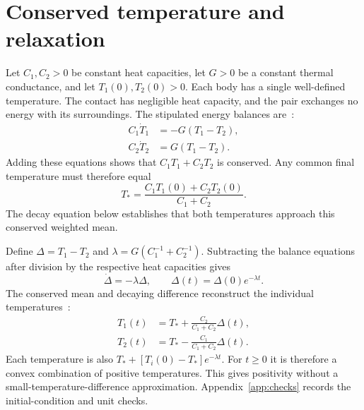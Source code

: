 \section{Conserved temperature and relaxation}
Let $C_1,C_2>0$ be constant heat capacities, let $G>0$ be a constant thermal conductance, and let $T_1(0),T_2(0)>0$. Each body has a single well-defined temperature. The contact has negligible heat capacity, and the pair exchanges no energy with its surroundings. The stipulated energy balances are~\cite{fixturemodel}:
\begin{align}
 C_1\dot T_1&=-G(T_1-T_2),\label{eq:balance1}\\
 C_2\dot T_2&= G(T_1-T_2).\label{eq:balance2}
\end{align}
Adding these equations shows that $C_1T_1+C_2T_2$ is conserved. Any common final temperature must therefore equal
\begin{equation}
 T_* = \frac{C_1T_1(0)+C_2T_2(0)}{C_1+C_2}.\label{eq:tstar}
\end{equation}
The decay equation below establishes that both temperatures approach this conserved weighted mean.

Define $\Delta=T_1-T_2$ and $\lambda=G(C_1^{-1}+C_2^{-1})$. Subtracting the balance equations after division by the respective heat capacities gives
\begin{equation}
 \dot\Delta=-\lambda\Delta,\qquad
 \Delta(t)=\Delta(0)e^{-\lambda t}.\label{eq:delta}
\end{equation}
The conserved mean and decaying difference reconstruct the individual temperatures~\cite{fixturealgebra}:
\begin{align}
 T_1(t)&=T_*+\frac{C_2}{C_1+C_2}\Delta(t),\label{eq:t1}\\
 T_2(t)&=T_*-\frac{C_1}{C_1+C_2}\Delta(t).\label{eq:t2}
\end{align}
Each temperature is also $T_*+[T_i(0)-T_*]e^{-\lambda t}$. For $t\geq0$ it is therefore a convex combination of positive temperatures. This gives positivity without a small-temperature-difference approximation. Appendix~\ref{app:checks} records the initial-condition and unit checks.

